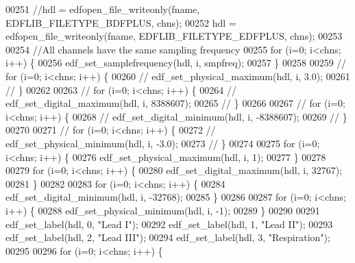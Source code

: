 \begin{DoxyCode}
00251 \textcolor{comment}{        //hdl = edfopen\_file\_writeonly(fname, EDFLIB\_FILETYPE\_BDFPLUS, chns);}
00252 \textcolor{comment}{        hdl = edfopen\_file\_writeonly(fname, EDFLIB\_FILETYPE\_EDFPLUS, chns);}
00253 \textcolor{comment}{}
00254 \textcolor{comment}{        //All channels have the same sampling frequency}
00255 \textcolor{comment}{        for (i=0; i<chns; i++) \{}
00256 \textcolor{comment}{            edf\_set\_samplefrequency(hdl, i, smpfreq);}
00257 \textcolor{comment}{        \}}
00258 \textcolor{comment}{}
00259 \textcolor{comment}{//        for (i=0; i<chns; i++) \{}
00260 \textcolor{comment}{//            edf\_set\_physical\_maximum(hdl, i, 3.0);}
00261 \textcolor{comment}{//        \}}
00262 \textcolor{comment}{}
00263 \textcolor{comment}{//        for (i=0; i<chns; i++) \{}
00264 \textcolor{comment}{//            edf\_set\_digital\_maximum(hdl, i, 8388607);}
00265 \textcolor{comment}{//        \}}
00266 \textcolor{comment}{}
00267 \textcolor{comment}{//        for (i=0; i<chns; i++) \{}
00268 \textcolor{comment}{//            edf\_set\_digital\_minimum(hdl, i, -8388607);}
00269 \textcolor{comment}{//        \}}
00270 \textcolor{comment}{}
00271 \textcolor{comment}{//        for (i=0; i<chns; i++) \{}
00272 \textcolor{comment}{//            edf\_set\_physical\_minimum(hdl, i, -3.0);}
00273 \textcolor{comment}{//        \}}
00274 \textcolor{comment}{}
00275 \textcolor{comment}{        for (i=0; i<chns; i++) \{}
00276 \textcolor{comment}{            edf\_set\_physical\_maximum(hdl, i, 1);}
00277 \textcolor{comment}{        \}}
00278 \textcolor{comment}{}
00279 \textcolor{comment}{        for (i=0; i<chns; i++) \{}
00280 \textcolor{comment}{            edf\_set\_digital\_maximum(hdl, i, 32767);}
00281 \textcolor{comment}{        \}}
00282 \textcolor{comment}{}
00283 \textcolor{comment}{        for (i=0; i<chns; i++) \{}
00284 \textcolor{comment}{            edf\_set\_digital\_minimum(hdl, i, -32768);}
00285 \textcolor{comment}{        \}}
00286 \textcolor{comment}{}
00287 \textcolor{comment}{        for (i=0; i<chns; i++) \{}
00288 \textcolor{comment}{            edf\_set\_physical\_minimum(hdl, i, -1);}
00289 \textcolor{comment}{        \}}
00290 \textcolor{comment}{}
00291 \textcolor{comment}{        edf\_set\_label(hdl, 0, "Lead I");}
00292 \textcolor{comment}{        edf\_set\_label(hdl, 1, "Lead II");}
00293 \textcolor{comment}{        edf\_set\_label(hdl, 2, "Lead III");}
00294 \textcolor{comment}{        edf\_set\_label(hdl, 3, "Respiration");}
00295 \textcolor{comment}{}
00296 \textcolor{comment}{        for (i=0; i<chns; i++) \{}

\end{DoxyCode}
